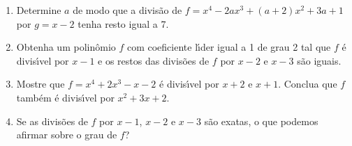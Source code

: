 \documentclass[a4paper,5pt]{amsbook}
\begin{document}
\begin{enumerate}
	\vspace{0.5cm}
	\item Determine $a$ de modo que a divis\~ao de $f=x^4-2ax^3 + (a+2)x^2 + 3a
		+1$ por $g=x-2$ tenha resto igual a 7.

	\vspace{0.5cm}
	\item Obtenha um polin\^omio $f$ com coeficiente l\'{\i}der igual a 1 de grau 2
		tal que $f$ \'e divis\'{\i}vel por $x-1$ e os restos das divis\~oes de $f$ por
		$x-2$ e $x-3$ s\~ao iguais.

	\vspace{0.5cm}
	\item Mostre que $f=x^4+2x^3-x-2$ \'e divis\'{\i}vel por $x+2$ e $x+1$. Conclua
		que $f$ tamb\'em \'e divis\'{\i}vel por $x^2+3x+2$.

	\vspace{0.5cm}
	\item Se as divis\~oes de $f$ por $x-1$, $x-2$ e $x-3$ s\~ao exatas, o que
		podemos afirmar sobre o grau de $f$?
\end{enumerate}
\end{document}
